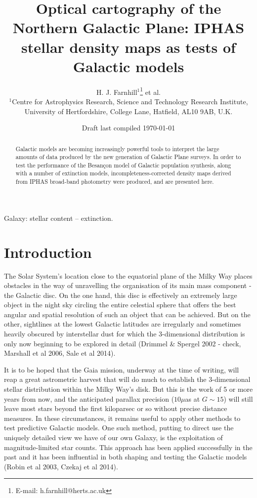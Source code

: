 \documentclass[a4paper,useAMS,usenatbib]{mn2e}
\title[Optical cartography of the Northern Galactic Plane]{Optical cartography 
of the Northern Galactic Plane: IPHAS stellar density maps as tests of Galactic models}
\author[H. J. Farnhill et al.]{H. J. Farnhill$^{1}$\thanks{E-mail:
h.farnhill@herts.ac.uk} et al.
\\
$^{1}$Centre for Astrophysics Research, Science and Technology Research Institute, University of Hertfordshire, College Lane, Hatfield, AL10 9AB, U.K.}
\begin{document}
\date{Draft last compiled \today}

\pagerange{\pageref{firstpage}--\pageref{lastpage}} 

\maketitle

\label{firstpage}

\begin{abstract}
Galactic models are becoming increasingly powerful tools to interpret the 
large amounts of data produced by the new generation of Galactic Plane 
surveys. In order to test the performance of the Besan\c{c}on model of 
Galactic population synthesis, along with a number of extinction models, 
incompleteness-corrected density maps derived from IPHAS broad-band photometry 
were produced, and are presented here.
\end{abstract}

\begin{keywords}
Galaxy: stellar content -- extinction.
\end{keywords}

\section{Introduction}
The Solar System's location close to the equatorial plane of the Milky
Way places obstacles in the way of unravelling the organisation of its main 
mass component - the Galactic disc.  On the one hand, this disc is effectively 
an extremely large object in the night sky circling the entire celestial sphere 
that offers the best angular and spatial resolution of such an object that can 
be achieved. But on the other, sightlines at the lowest Galactic latitudes are 
irregularly and sometimes heavily obscured by interstellar dust for which the 
3-dimensional distribution is only now beginning to be explored in detail 
(Drimmel \& Spergel 2002 - check, Marshall et al 2006, Sale et al 2014).  

It is to be hoped that the Gaia 
mission, underway at the time of writing, will reap a great astrometric 
harvest that will do much to establish the 3-dimensional stellar 
distribution within the Milky Way's disk.  But this is the work of 5 or 
more years from now, and the anticipated parallax precision ($10\mu$as at 
$G \sim 15$) will still leave most stars beyond the first kiloparsec or so 
without precise distance measures.  In these circumstances, it remains useful 
to apply other methods to test predictive Galactic models.  One such 
method, putting to direct use the uniquely detailed view we have of our 
own Galaxy, is the exploitation of magnitude-limited star counts.  This 
approach has been applied successfully in the past and it 
has been influential in both shaping and testing the Galactic 
models (Robin et al 2003, Czekaj et al 2014).  
\end{document}

